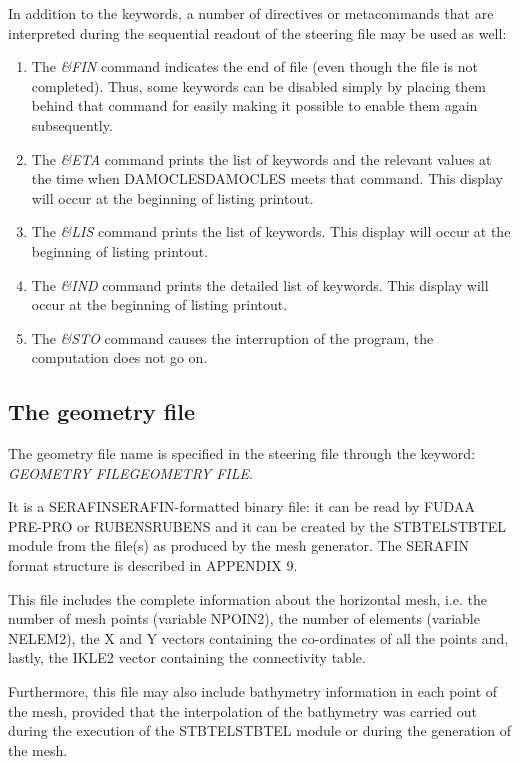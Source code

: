  In addition to the keywords, a number of directives or metacommands that are interpreted during the sequential readout of the steering file may be used as well:

\begin{enumerate}
\item  The \textit{\&FIN} command indicates the end of file (even though the file is not completed). Thus, some keywords can be disabled simply by placing them behind that command for easily making it possible to enable them again subsequently.

\item  The \textit{\&ETA} command prints the list of keywords and the relevant values at the time when DAMOCLESDAMOCLES meets that command. This display will occur at the beginning of listing printout.

\item  The \textit{\&LIS} command prints the list of keywords. This display will occur at the beginning of listing printout.

\item  The \textit{\&IND} command prints the detailed list of keywords. This display will occur at the beginning of listing printout.

\item  The \textit{\&STO} command causes the interruption of the program, the computation does not go on.
\end{enumerate}


\subsection{ The geometry file}

 The geometry file name is specified in the steering file through the keyword: \textit{GEOMETRY FILEGEOMETRY FILE}.

 It is a SERAFINSERAFIN-formatted binary file: it can be read by FUDAA PRE-PRO or RUBENSRUBENS and it can be created by the STBTELSTBTEL module from the file(s) as produced by the mesh generator. The SERAFIN format structure is described in APPENDIX 9.

 This file includes the complete information about the horizontal mesh, i.e. the number of mesh points (variable NPOIN2), the number of elements (variable NELEM2), the X and Y vectors containing the co-ordinates of all the points and, lastly, the IKLE2 vector containing the connectivity table.

 Furthermore, this file may also include bathymetry information in each point of the mesh, provided that the interpolation of the bathymetry was carried out during the execution of the STBTELSTBTEL module or during the generation of the mesh.

